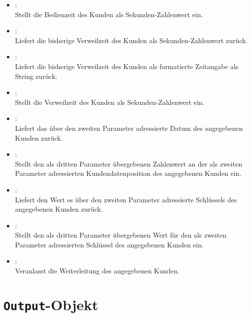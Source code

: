 \begin{itemize}
\item
{}:\\
Stellt die Bedienzeit des Kunden als Sekunden-Zahlenwert ein.

\item
{}:\\
Liefert die bisherige Verweilzeit des Kunden als Sekunden-Zahlenwert zurück.

\item
{}:\\
Liefert die bisherige Verweilzeit des Kunden als formatierte Zeitangabe als String zurück.

\item
{}:\\
Stellt die Verweilzeit des Kunden als Sekunden-Zahlenwert ein.

\item
{}:\\
Liefert das über den zweiten Parameter adressierte Datum des angegebenen Kunden zurück.

\item
{}:\\
Stellt den als dritten Parameter übergebenen Zahlenwert an der als zweiten Parameter adressierten Kundendatenposition des angegebenen Kunden ein.

\item
{}:\\
Liefert den Wert es über den zweiten Parameter adressierte Schlüssels des angegebenen Kunden zurück.

\item
{}:\\
Stellt den als dritten Parameter übergebenen Wert für den als zweiten Parameter adressierten Schlüssel des angegebenen Kunden ein.

\item
{}:\\
Veranlasst die Weiterleitung des angegebenen Kunden.
	
\end{itemize}



\chapter{\texttt{Output}-Objekt}

